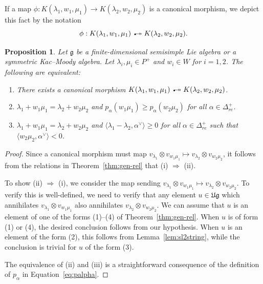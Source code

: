 \documentclass[12pt,reqno]{amsart}
\theoremstyle{plain}
\newtheorem{proposition}[theorem]{Proposition}
\theoremstyle{definition}
\theoremstyle{remark}
\theoremstyle{plain}
\newcommand{\posreal}[1][+]{\Delta_{re}^{#1}}
\newcommand{\lie}{\mathfrak}
\newcommand{\twoheadrightarrowtail}{%
  \mathrel{\mathrlap{\scalebox{0.75}{\textbullet}}\twoheadrightarrow}}
\newcommand{\canmor}{\twoheadrightarrowtail}
\begin{document}
\subsection{} If a map $\phi: K(\lambda_1,w_1,\mu_1) \to K(\lambda_2,w_2,\mu_2)$ is a canonical morphism, we depict this fact by the notation \[\phi: K(\lambda_1,w_1,\mu_1) \canmor K(\lambda_2,w_2,\mu_2).\]
\begin{proposition}\label{prop:canmor}
    Let $\lie g$ be a finite-dimensional semisimple Lie algebra or a symmetric Kac--Moody algebra. Let $\lambda_i, \mu_i \in P^+$ and $w_i \in W$ for $i=1, 2$. The following are equivalent:
    \begin{enumerate}
        \item[(i)] There exists a canonical morphism $K(\lambda_1,w_1,\mu_1) \canmor K(\lambda_2,w_2,\mu_2)$.
        \item[(ii)] $\lambda_1 + w_1\mu_1 = \lambda_2 + w_2\mu_2$ and $p_\alpha(w_1\mu_1) \geq p_\alpha(w_2\mu_2)$ for all $\alpha \in \posreal$.
        \item[(iii)] $\lambda_1 + w_1\mu_1 = \lambda_2 + w_2\mu_2$ and $\langle \lambda_1 - \lambda_2, \alpha^\vee \rangle \geq 0$ for all $\alpha \in \posreal$ such that \\ $\langle w_2\mu_2, \alpha^\vee\rangle <0$.
    \end{enumerate}
\end{proposition}
\begin{proof}
Since a canonical morphism must map $v_{\lambda_1} \otimes v_{w_1\mu_1} \mapsto v_{\lambda_2} \otimes v_{w_2\mu_2}$, it follows from the relations in Theorem~\ref{thm:gen-rel} that (i) $\Rightarrow$ (ii). 

To show (ii) $\Rightarrow$ (i), we consider the map sending $v_{\lambda_1} \otimes v_{w_1\mu_1} \mapsto v_{\lambda_2} \otimes v_{w_2\mu_2}$. To verify this is well-defined, we need to verify that any element $u \in \lie{Ug}$ which annihilates $v_{\lambda_1} \otimes v_{w_1\mu_1}$ also annihilates $v_{\lambda_2} \otimes v_{w_2\mu_2}$. We can assume that $u$ is an element of one of the forms (1)--(4) of Theorem~\ref{thm:gen-rel}. When $u$ is of form (1) or (4), the desired conclusion follows from our hypothesis. When $u$ is an element of the form (2), this follows from Lemma~\ref{lem:sl2string}, while the conclusion is trivial for $u$ of the form (3).

The equivalence of (ii) and  (iii) is a straightforward consequence of the definition of $p_\alpha$ in Equation~\eqref{eq:palpha}.
\end{proof}
\end{document}
